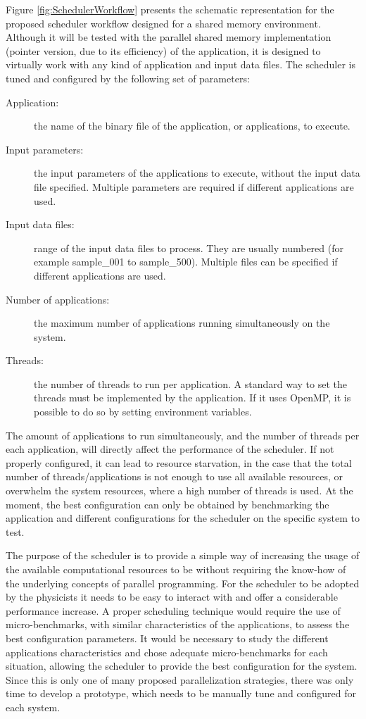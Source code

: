 Figure \ref{fig:SchedulerWorkflow} presents the schematic representation for the proposed scheduler workflow designed for a shared memory environment. Although it will be tested with the parallel shared memory implementation (pointer version, due to its efficiency) of the \tth application, it is designed to virtually work with any kind of application and input data files. The scheduler is tuned and configured by the following set of parameters:

\begin{description}
	\item[Application:] the name of the binary file of the application, or applications, to execute.
	\item[Input parameters:] the input parameters of the applications to execute, without the input data file specified. Multiple parameters are required if different applications are used.
	\item[Input data files:] range of the input data files to process. They are usually numbered (for example sample\_001 to sample\_500). Multiple files can be specified if different applications are used.
	\item[Number of applications:] the maximum number of applications running simultaneously on the system.
	\item[Threads:] the number of threads to run per application. A standard way to set the threads must be implemented by the application. If it uses OpenMP, it is possible to do so by setting environment variables.
\end{description}

The amount of applications to run simultaneously, and the number of threads per each application, will directly affect the performance of the scheduler. If not properly configured, it can lead to resource starvation, in the case that the total number of threads/applications is not enough to use all available resources, or overwhelm the system resources, where a high number of threads is used. At the moment, the best configuration can only be obtained by benchmarking the application and different configurations for the scheduler on the specific system to test.

The purpose of the scheduler is to provide a simple way of increasing the usage of the available computational resources to be without requiring the know-how of the underlying concepts of parallel programming. For the scheduler to be adopted by the physicists it needs to be easy to interact with and offer a considerable performance increase. A proper scheduling technique would require the use of micro-benchmarks, with similar characteristics of the applications, to assess the best configuration parameters. It would be necessary to study the different applications characteristics and chose adequate micro-benchmarks for each situation, allowing the scheduler to provide the best configuration for the system. Since this is only one of many proposed parallelization strategies, there was only time to develop a prototype, which needs to be manually tune and configured for each system.

